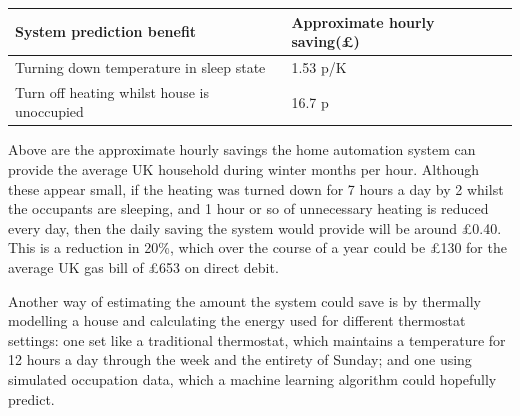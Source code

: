 \documentclass[10.5pt,a4paper,twoside]{report}   %
\begin{document}
\begin{table}[h!]
    \begin{tabular}{|l|l|}
    \hline
    \textbf{System prediction benefit} & \textbf{Approximate hourly saving(\pounds)} \\ \hline
    Turning down temperature in sleep state     & 1.53 p/K                  \\ \hline
    Turn off heating whilst house is unoccupied & 16.7 p                    \\ \hline
    \end{tabular}
\end{table}

Above are the approximate hourly savings the home automation system can provide the average UK household during winter months per hour. Although these appear small, if the heating was turned down for 7 hours a day by 2 \celsius whilst the occupants are sleeping, and 1 hour or so of unnecessary heating is reduced every day, then the daily saving the system would provide will be around \pounds 0.40. This is a reduction in 20\%, which over the course of a year could be \pounds 130 for the average UK gas bill of \pounds 653 on direct debit.

Another way of estimating the amount the system could save is by thermally modelling a house and calculating the energy used for different thermostat settings: one set like a traditional thermostat, which maintains a temperature for 12 hours a day through the week and the entirety of Sunday; and one using simulated occupation data, which a machine learning algorithm could hopefully predict.
\end{document}
